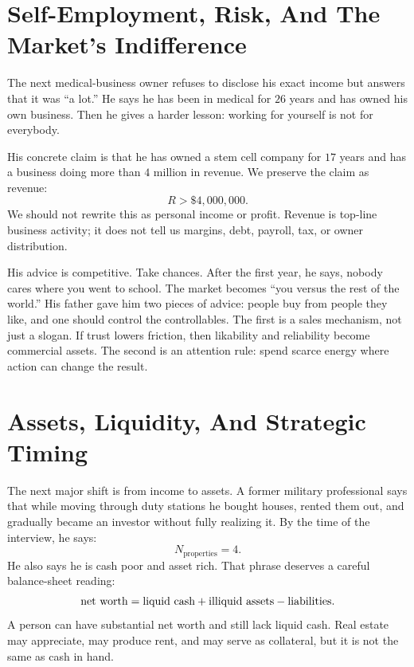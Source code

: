 \section{Self-Employment, Risk, And The Market's Indifference}

The next medical-business owner refuses to disclose his exact income but answers that it was ``a lot.'' He says he has been in medical for \(26\) years and has owned his own business. Then he gives a harder lesson: working for yourself is not for everybody.

His concrete claim is that he has owned a stem cell company for \(17\) years and has a business doing more than \(4\) million in revenue. We preserve the claim as revenue:
\begin{equation}
R > \$4{,}000{,}000.
\end{equation}
We should not rewrite this as personal income or profit. Revenue is top-line business activity; it does not tell us margins, debt, payroll, tax, or owner distribution.

His advice is competitive. Take chances. After the first year, he says, nobody cares where you went to school. The market becomes ``you versus the rest of the world.'' His father gave him two pieces of advice: people buy from people they like, and one should control the controllables. The first is a sales mechanism, not just a slogan. If trust lowers friction, then likability and reliability become commercial assets. The second is an attention rule: spend scarce energy where action can change the result.

\section{Assets, Liquidity, And Strategic Timing}

The next major shift is from income to assets. A former military professional says that while moving through duty stations he bought houses, rented them out, and gradually became an investor without fully realizing it. By the time of the interview, he says:
\begin{equation}
N_{\mathrm{properties}} = 4.
\end{equation}
He also says he is cash poor and asset rich. That phrase deserves a careful balance-sheet reading:
\begin{equation}
\hbox{net worth}
  =
  \hbox{liquid cash}
  +
  \hbox{illiquid assets}
  -
  \hbox{liabilities}.
\end{equation}
A person can have substantial net worth and still lack liquid cash. Real estate may appreciate, may produce rent, and may serve as collateral, but it is not the same as cash in hand.


